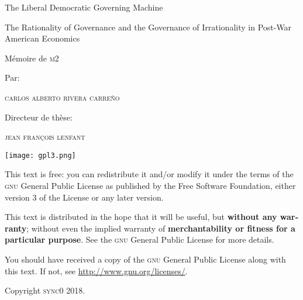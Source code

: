 \documentclass[paper=B6,portrait,twoside=true,twocolumn=false,headinclude=true,footinclude=false,fontsize=12,BCOR=10mm,DIV=calc,pagesize=auto,titlepage=firstiscover,mpinclude=false,headings=normal,headings=twolinechapter,open=right,toc=graduated,chapterprefix=false,numbers=endperiod,parskip=half+]{scrbook}
\author{Carlos Alberto Rivera Carreño}
\date{}
\title{}
\theoremstyle{definition}
\begin{document}
\begin{titlepage}
 \centering
 \vspace{4\baselineskip}
 {\Huge The Liberal Democratic Governing Machine \par}
 \vspace{1\baselineskip}
 {\Large The Rationality of Governance and the Governance of Irrationality in Post-War American Economics \par}
\vspace*{\fill}
 {\Large Mémoire de \textsc{m2} \par}
 \vspace{2\baselineskip}
 {\large Par: \par}
 {\large \textsc{carlos alberto rivera carreño}\par}
 \vspace{1\baselineskip}
 {\large Directeur de thèse: \par}
 {\large \textsc{jean françois lenfant}\par}
\end{titlepage}

\pagestyle{empty}

\vspace*{\fill}
\noindent
\texttt{[image: gpl3.png]}\par
\vspace{1\baselineskip}
\begin{english}
This text is free: you can redistribute it and/or modify it
under the terms of the \textsc{gnu} General Public License as published by
the Free Software Foundation, either version 3 of the License or any later
version.

This text is distributed in the hope that it will be useful, but \textbf{without
any warranty}; without even the implied warranty of \textbf{merchantability or 
fitness for a particular purpose}. See the \textsc{gnu} General 
Public License for more details.

You should have received a copy of the \textsc{gnu} General Public License along
with this text. If not, see \url{http://www.gnu.org/licenses/}.

\vspace{1\baselineskip}
\noindent
Copyright \textcopyright \textsc{sync0} 2018. 
\end{english}

\newpage 
\vspace*{\fill}
\end{document}

